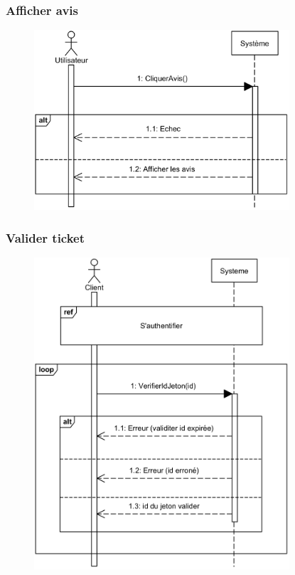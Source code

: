     \subsubsection[Afficher avis]{Afficher avis}
        \begin{figure}[H]
            \centering
            \includegraphics[width=95mm]{images/sd-afficher-avis.png}
            \label{fig:sdAffavis}
        \end{figure}
    \subsubsection[Valider ticket]{Valider ticket}
        \begin{figure}[H]
            \centering
            \includegraphics[width=95mm]{images/sd-valider-ticket.png}
            \label{fig:sdValiderTicket}
        \end{figure}
\pagebreak

